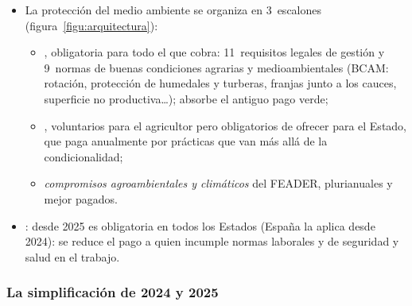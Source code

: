 \documentclass[11pt]{article}
\begin{document}
\begin{itemize}
\item La protección del medio ambiente se organiza en 3~escalones (figura~\ref{figu:arquitectura}):
  \begin{itemize}
  \item {}, obligatoria para todo el que cobra: 11~requisitos legales de gestión y 9~normas de buenas condiciones agrarias y medioambientales (BCAM: rotación, protección de humedales y turberas, franjas junto a los cauces, superficie no productiva\ldots); absorbe el antiguo pago verde;
  \item {}, voluntarios para el agricultor pero obligatorios de ofrecer para el Estado, que paga anualmente por prácticas que van más allá de la condicionalidad;
  \item \emph{compromisos agroambientales y climáticos} del FEADER, plurianuales y mejor pagados.
  \end{itemize}
\item {}: desde 2025 es obligatoria en todos los Estados (España la aplica desde 2024): se reduce el pago a quien incumple normas laborales y de seguridad y salud en el trabajo.
\end{itemize}

\begin{infografia}[H]
\centering
\caption{La arquitectura verde de la PAC 2023-2027}\label{figu:arquitectura}
\end{infografia}

\subsubsection{La simplificación de 2024 y 2025}\label{sec:simplificacion}
\end{document}
